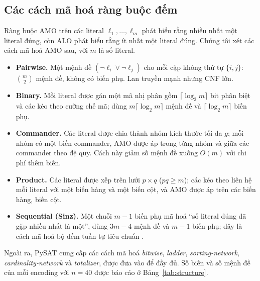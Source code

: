 \documentclass[a4paper,fleqn]{cas-sc}
\begin{document}
\subsection{Các cách mã hoá ràng buộc đếm}
Ràng buộc AMO trên các literal $\ell_1,\dots,\ell_m$ phát biểu rằng nhiều nhất
một literal đúng, còn ALO phát biểu rằng ít nhất một literal đúng. Chúng tôi xét
các cách mã hoá AMO sau, với $m$ là số literal.
\begin{itemize}
  \item \textbf{Pairwise.} Một mệnh đề $(\neg \ell_i \vee \neg \ell_j)$ cho mỗi
        cặp không thứ tự $\{i,j\}$: $\binom{m}{2}$ mệnh đề, không có biến phụ.
        Lan truyền mạnh nhưng CNF lớn.
  \item \textbf{Binary.} Mỗi literal được gán một mã nhị phân gồm
        $\lceil \log_2 m \rceil$ bit phân biệt và các kéo theo cưỡng chế mã; dùng
        $m\lceil\log_2 m\rceil$ mệnh đề và $\lceil\log_2 m\rceil$ biến phụ.
  \item \textbf{Commander.} Các literal được chia thành nhóm kích thước tối đa
        $g$; mỗi nhóm có một biến commander, AMO được áp trong từng nhóm và giữa
        các commander theo đệ quy. Cách này giảm số mệnh đề xuống $O(m)$ với chi
        phí thêm biến.
  \item \textbf{Product.} Các literal được xếp trên lưới $p\times q$ ($pq \geq
        m$); các kéo theo liên hệ mỗi literal với một biến hàng và một biến cột,
        và AMO được áp trên các biến hàng, biến cột.
  \item \textbf{Sequential (Sinz).} Một chuỗi $m-1$ biến phụ mã hoá ``số literal
        đúng đã gặp nhiều nhất là một'', dùng $3m-4$ mệnh đề và $m-1$ biến phụ;
        đây là cách mã hoá bộ đếm tuần tự tiêu chuẩn \citep{Sinz2005}.
\end{itemize}
Ngoài ra, PySAT \citep{Ignatiev2018} cung cấp các cách mã hoá \emph{bitwise},
\emph{ladder}, \emph{sorting-network}, \emph{cardinality-network} và
\emph{totalizer}, được đưa vào để đầy đủ. Số biến và số mệnh đề của mỗi encoding
với $n=40$ được báo cáo ở Bảng~\ref{tab:structure}.
\end{document}
